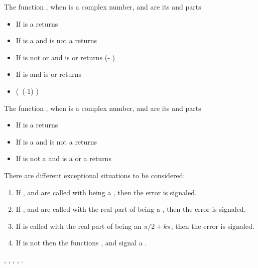 \documentclass[../Exponentials-Logarithms-Trigonometry.tex]{subfiles}
\begin{document}
\noindent
The function , when  is a complex number, 
and  are its  and  parts
\begin{itemize}
  \item If  is a  returns 
  \item If  is a  and  is not a
   returns \code{)))}
  \item If  is not  or  and
   is  or  returns
   \code{)} (- )\code{))}
  \item If  is  and  is
   or  returns
  \item {}(\ (-1) )\code{)}
\end{itemize}

\noindent
The function , when  is a complex number, 
and  are its  and  parts
\begin{itemize}
  \item If  is a  returns 
  \item If  is a  and  is not a
   returns \code{))))}
  \item If  is not a  and  is a
   or a  returns \code{))}
\end{itemize}

\DExceptional{}

There are different exceptional situations to be considered:
\begin{enumerate}
  \item If ,  and  are called with
     being a , then the
     error is signaled.
  \item If ,  and  are called with the real
    part of  being a , then the
     error is signaled.
  \item If  is called with the real part of
     being an $\pi/2 + k\pi$, then the
     error is signaled.
  \item If  is not \CL{}
     then the functions ,  and
     signal a .
\end{enumerate}

\DSeeAlso{}

\code{*}, \code{-}, , , .
\end{document}
